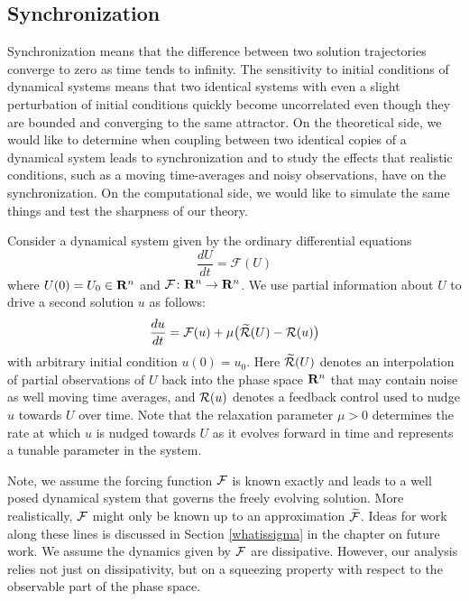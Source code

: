 \documentclass[master,tocprelim,12pt]{unrthesis}
\theoremstyle{definition}
\newcommand{\cF}{{\mathcal F}}
\numberwithin{equation}{chapter}
\begin{document}
\begin{manuscript}
\section{Synchronization}\label{Synchro}

Synchronization means that the difference between two solution
trajectories converge to zero as time tends to infinity.  The sensitivity
to initial conditions of dynamical systems means that two identical
systems with even a slight perturbation of initial conditions quickly
become uncorrelated even though they are bounded and converging to the
same attractor.  
On the theoretical side, we would like to determine 
when coupling between two identical copies of a dynamical system
leads to synchronization and to study the effects that
realistic conditions, such as a moving time-averages and 
noisy observations, have on the synchronization.
On the computational
side, we would like to simulate the same things and test the
sharpness of our theory.

Consider a dynamical system given by the ordinary differential equations
\begin{equation}\label{freeODE}
    \frac{dU}{dt} = \cF(U) 
\end{equation}
where $U(0) = U_0\in{\bf R}^n$ and ${\cal F}\colon{\bf R}^n\to{\bf R}^n$.
We use partial information about $U$ to drive a second solution $u$
as follows:
\begin{equation}\label{noerra}
    \frac{du}{dt} = \cF(u) + \mu\big(\widetilde{\cal R}(U) - {\cal R}(u)\big)
\end{equation}
with arbitrary initial condition $u(0) = u_0$.
Here $\widetilde{\cal R}(U)$ denotes an interpolation of
partial observations of $U$ back into the phase space ${\bf R}^n$
that may contain noise as well moving time averages, and
${\cal R}(u)$ denotes a feedback control used to nudge $u$
towards $U$ over time.
Note that the relaxation parameter $\mu > 0$ 
determines the rate
at which $u$ is nudged towards $U$ as it evolves forward in time 
and represents a tunable parameter in the system.

Note, we assume the forcing function ${\cal F}$ is known 
exactly and leads to a well posed dynamical system that governs
the freely evolving solution.
More realistically, ${\cal F}$ might only be known up to an
approximation $\widetilde {\cal F}$.  Ideas for work along these 
lines is discussed in Section \ref{whatissigma} in the
chapter on future work.  
We assume the dynamics given by ${\cal F}$ are dissipative.
However, our analysis relies not just on dissipativity, but
on a squeezing property with respect to the observable
part of the phase space.


\end{manuscript}
\end{document}
